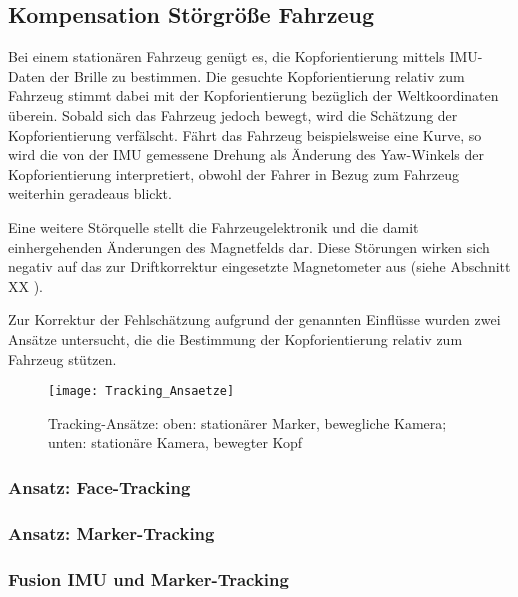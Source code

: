 
\subsection{Kompensation Störgröße Fahrzeug}

Bei einem stationären Fahrzeug genügt es, die Kopforientierung mittels \acs{IMU}-Daten der Brille zu bestimmen. Die gesuchte Kopforientierung relativ zum Fahrzeug stimmt dabei mit der Kopforientierung bezüglich der Weltkoordinaten überein. Sobald sich das Fahrzeug jedoch bewegt, wird die Schätzung der Kopforientierung verfälscht. Fährt das Fahrzeug beispielsweise eine Kurve, so wird die von der IMU gemessene Drehung als Änderung des Yaw-Winkels der Kopforientierung interpretiert, obwohl der Fahrer in Bezug zum Fahrzeug weiterhin geradeaus blickt.

Eine weitere Störquelle stellt die Fahrzeugelektronik und die damit einhergehenden Änderungen des Magnetfelds dar. Diese Störungen wirken sich negativ auf das zur Driftkorrektur eingesetzte Magnetometer aus (siehe Abschnitt XX ).

Zur Korrektur der Fehlschätzung aufgrund der genannten Einflüsse wurden zwei Ansätze untersucht, die die Bestimmung der Kopforientierung relativ zum Fahrzeug stützen.

\begin{figure}[h]
  \centering
  \texttt{[image: Tracking\_Ansaetze]}
  \caption{Tracking-Ansätze: oben: stationärer Marker, bewegliche Kamera; unten: stationäre Kamera, bewegter Kopf}
  \label{fig:tracking_ansaetze}
\end{figure}

\subsubsection{Ansatz: Face-Tracking}



\subsubsection{Ansatz: Marker-Tracking}



\subsubsection{Fusion IMU und Marker-Tracking}
